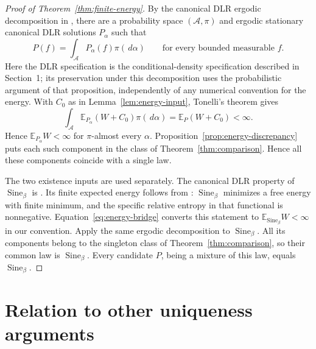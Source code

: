\documentclass[11pt,reqno]{amsart}
\numberwithin{equation}{section}
\theoremstyle{definition}
\theoremstyle{remark}
\newcommand{\E}{\mathbb E}
\newcommand{\1}{\mathbf 1}
\newcommand{\Sine}{\operatorname{Sine}}
\newcommand{\dd}{\,d}
\begin{document}
\begin{proof}[Proof of Theorem~\ref{thm:finite-energy}]
By the canonical DLR ergodic decomposition in
\cite[Proposition~3.13]{DHLM}, there are a probability space
$(\mathcal A,\pi)$ and ergodic stationary canonical DLR solutions
$P_\alpha$ such that
\begin{equation}\label{eq:ergodic-decomposition}
P(f)=\int_{\mathcal A}P_\alpha(f)\pi(\dd\alpha)
\qquad\text{for every bounded measurable }f.
\end{equation}
Here the DLR specification is the conditional-density specification
described in Section~1; its preservation under this decomposition
uses the probabilistic argument of that proposition, independently
of any numerical convention for the energy.
With $C_0$ as in Lemma~\ref{lem:energy-input}, Tonelli's theorem gives
\[
\int_{\mathcal A}\E_{P_\alpha}(W+C_0)\pi(\dd\alpha)
 =\E_P(W+C_0)<\infty.
\]
Hence $\E_{P_\alpha}W<\infty$ for $\pi$-almost every $\alpha$.
Proposition~\ref{prop:energy-discrepancy} puts each such component in
the class of Theorem~\ref{thm:comparison}. Hence all these components
coincide with a single law.

The two existence inputs are used separately. The canonical DLR
property of $\Sine_\beta$ is \cite[Theorem~2.1]{DHLM}.
Its finite expected energy follows from \cite[Corollary~1.2]{LS}:
$\Sine_\beta$ minimizes a free energy with finite minimum, and the
specific relative entropy in that functional is nonnegative.
Equation~\eqref{eq:energy-bridge} converts this statement to
$\E_{\Sine_\beta}W<\infty$ in our convention.
Apply the same ergodic decomposition to $\Sine_\beta$. All its
components belong to the singleton class of
Theorem~\ref{thm:comparison}, so their common law is $\Sine_\beta$.
Every candidate $P$, being a mixture of this law, equals
$\Sine_\beta$.
\end{proof}


\section{Relation to other uniqueness arguments}
\end{document}
